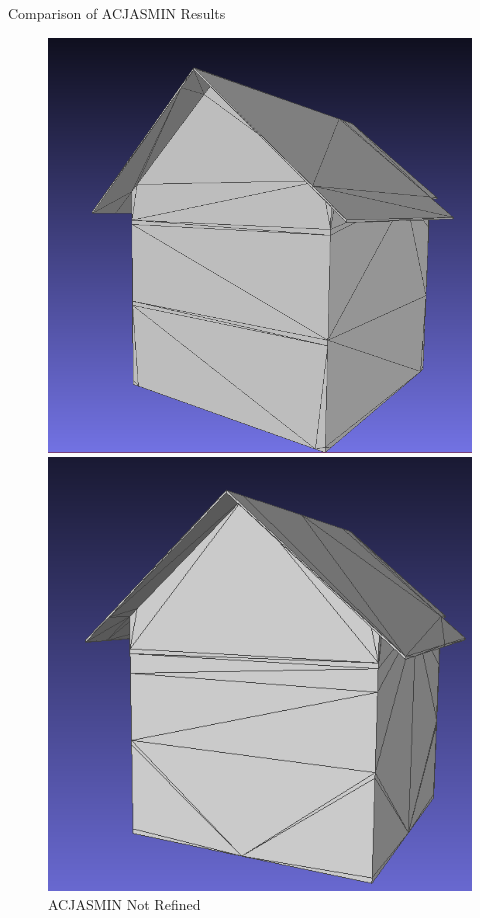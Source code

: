 \documentclass[10pt]{beamer}
\begin{document}
\begin{frame}{Comparison of ACJASMIN Results}
    \begin{figure}
      \centering
      \begin{minipage}[b]{0.48\textwidth}
        \centering
        \includegraphics[width=\textwidth]{../image/ACJASMIN2000_0.04_refine.png}
        \caption{ACJASMIN Refined}
      \end{minipage}\hfill
      \begin{minipage}[b]{0.48\textwidth}
        \centering
        \includegraphics[width=\textwidth]{../image/ACJASMIN_2000_0.04.png}
        \caption{ACJASMIN Not Refined}
      \end{minipage}
    \end{figure}
    \end{frame}
\end{document}
